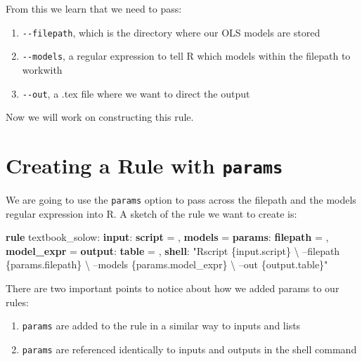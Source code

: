 \documentclass[]{book}
\newenvironment{Shaded}{\begin{snugshade}}{\end{snugshade}}
\newcommand{\KeywordTok}[1]{\textcolor[rgb]{0.13,0.29,0.53}{\textbf{{#1}}}}
\newcommand{\StringTok}[1]{\textcolor[rgb]{0.31,0.60,0.02}{{#1}}}
\newcommand{\NormalTok}[1]{{#1}}
\providecommand{\tightlist}{%
  \setlength{\itemsep}{0pt}\setlength{\parskip}{0pt}}
\theoremstyle{definition}
\theoremstyle{definition}
\theoremstyle{definition}
\theoremstyle{remark}
\begin{document}
From this we learn that we need to pass:

\begin{enumerate}
\def\labelenumi{\arabic{enumi}.}
\tightlist
\item
  \texttt{-\/-filepath}, which is the directory where our OLS models are
  stored
\item
  \texttt{-\/-models}, a regular expression to tell R which models
  within the filepath to workwith
\item
  \texttt{-\/-out}, a .tex file where we want to direct the output
\end{enumerate}

Now we will work on constructing this rule.

\section{\texorpdfstring{Creating a Rule with
\texttt{params}}{Creating a Rule with params}}\label{creating-a-rule-with-params}

We are going to use the \texttt{params} option to pass across the
filepath and the models regular expression into R. A sketch of the rule
we want to create is:

\begin{Shaded}
\begin{Highlighting}[]
\KeywordTok{rule} \NormalTok{textbook_solow:}
    \KeywordTok{input}\NormalTok{:}
        \KeywordTok{script} \NormalTok{= ,}
        \KeywordTok{models} \NormalTok{=}
    \KeywordTok{params}\NormalTok{:}
        \KeywordTok{filepath}   \NormalTok{= ,}
        \KeywordTok{model_expr} \NormalTok{=}
    \KeywordTok{output}\NormalTok{:}
        \KeywordTok{table} \NormalTok{= ,}
    \KeywordTok{shell}\NormalTok{:}
        \StringTok{"Rscript \{input.script\} \textbackslash{}}
\StringTok{            --filepath \{params.filepath\} \textbackslash{}}
\StringTok{            --models \{params.model_expr\} \textbackslash{}}
\StringTok{            --out \{output.table\}"}
\end{Highlighting}
\end{Shaded}

There are two important points to notice about how we added params to
our rules:

\begin{enumerate}
\def\labelenumi{\arabic{enumi}.}
\tightlist
\item
  \texttt{params} are added to the rule in a similar way to inputs and
  lists
\item
  \texttt{params} are referenced identically to inputs and outputs in
  the shell command
\end{enumerate}
\end{document}
